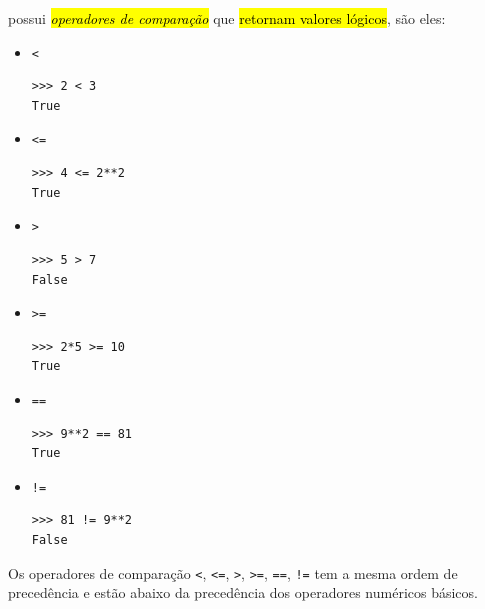{\python} possui \hl{\emph{operadores de comparação}} que \hl{retornam valores lógicos}, são eles:
\begin{itemize}
\item \lstinline+<+ 

\begin{lstlisting}[framexrightmargin=-2.5em]
>>> 2 < 3
True
\end{lstlisting}

\item \lstinline+<=+ 

\begin{lstlisting}[framexrightmargin=-2.5em]
>>> 4 <= 2**2
True
\end{lstlisting}

\item \lstinline+>+ 

\begin{lstlisting}[framexrightmargin=-2.5em]
>>> 5 > 7
False
\end{lstlisting}

\item \lstinline+>=+ 

\begin{lstlisting}[framexrightmargin=-2.5em]
>>> 2*5 >= 10
True
\end{lstlisting}

\item \lstinline+==+ 

\begin{lstlisting}[framexrightmargin=-2.5em]
>>> 9**2 == 81
True
\end{lstlisting}

\item \lstinline+!=+ 

\begin{lstlisting}[framexrightmargin=-2.5em]
>>> 81 != 9**2
False
\end{lstlisting}

\end{itemize}

\begin{obs}
  Os operadores de comparação \lstinline+<+, \lstinline+<=+, \lstinline+>+, \lstinline+>=+, \lstinline+==+, \lstinline+!=+ tem a mesma ordem de precedência e estão abaixo da precedência dos operadores numéricos básicos.
\end{obs}

